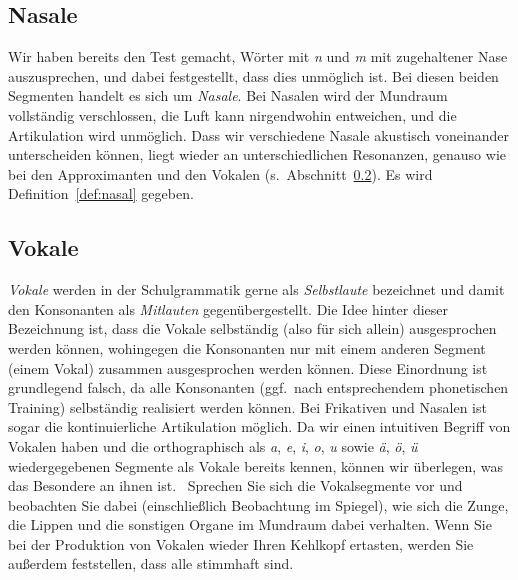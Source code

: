 \subsection{Nasale}

\label{sec:nasale}

Wir haben bereits den Test gemacht, Wörter mit \textit{n} und \textit{m} mit zugehaltener Nase auszusprechen, und dabei festgestellt, dass dies unmöglich ist.
Bei diesen beiden Segmenten handelt es sich um \textit{Nasale}.
Bei Nasalen wird der Mundraum vollständig verschlossen, die Luft kann nirgendwohin entweichen, und die Artikulation wird unmöglich.
Dass wir verschiedene Nasale akustisch voneinander unterscheiden können, liegt wieder an unterschiedlichen Resonanzen, genauso wie bei den Approximanten und den Vokalen (s.\ Abschnitt~\ref{sec:vokale}).
Es wird Definition~\ref{def:nasal} gegeben.


\subsection{Vokale}

\label{sec:vokale}

\textit{Vokale} werden in der Schulgrammatik gerne als \textit{Selbstlaute} bezeichnet und damit den Konsonanten als \textit{Mitlauten} gegenübergestellt.
Die Idee hinter dieser Bezeichnung ist, dass die Vokale selbständig (also für sich allein) ausgesprochen werden können, wohingegen die Konsonanten nur mit einem anderen Segment (einem Vokal) zusammen ausgesprochen werden können.
Diese Einordnung ist grundlegend falsch, da alle Konsonanten (ggf.\ nach entsprechendem phonetischen Training) selbständig realisiert werden können.
Bei Frikativen und Nasalen ist sogar die kontinuierliche Artikulation möglich.
Da wir einen intuitiven Begriff von Vokalen haben und die orthographisch als \textit{a}, \textit{e}, \textit{i}, \textit{o}, \textit{u} sowie \textit{ä}, \textit{ö}, \textit{ü} wiedergegebenen Segmente als Vokale bereits kennen, können wir überlegen, was das Besondere an ihnen ist.
\TuBegin~Sprechen Sie sich die Vokalsegmente vor und beobachten Sie dabei (einschließlich Beobachtung im Spiegel), wie sich die Zunge, die Lippen und die sonstigen Organe im Mundraum dabei verhalten. Wenn Sie bei der Produktion von Vokalen wieder Ihren Kehlkopf ertasten, werden Sie außerdem feststellen, dass alle stimmhaft sind.


